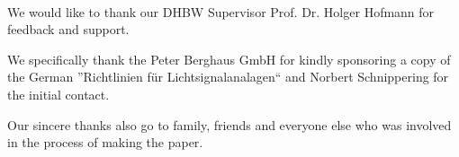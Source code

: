 \vspace{3cm}
\begingroup
{}\\
\endgroup
\vspace{1.5cm}

We would like to thank our DHBW Supervisor Prof. Dr. Holger Hofmann for feedback and support.

We specifically thank the Peter Berghaus GmbH for kindly sponsoring a copy of the German ''Richtlinien für Lichtsignalanalagen`` and Norbert Schnippering for the initial contact.

Our sincere thanks also go to family, friends and everyone else who was involved in the process of making the paper.